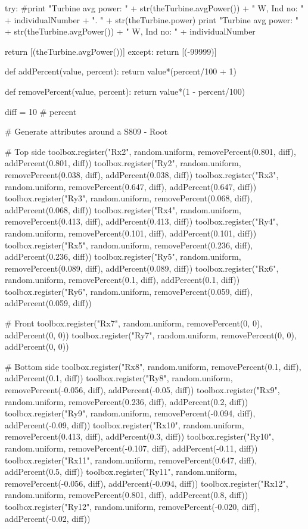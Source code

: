 \begin{pythoncode}
    
    try:
        #print "Turbine avg power: " + str(theTurbine.avgPower()) + " W, Ind no: " + individualNumber + ". " + str(theTurbine.power)
        print "Turbine avg power: " + str(theTurbine.avgPower()) + " W, Ind no: " + individualNumber 

        return [(theTurbine.avgPower())]
    except:
        return [(-99999)]


def addPercent(value, percent):
    return value*(percent/100 + 1)

def removePercent(value, percent):
    return value*(1 - percent/100)

diff = 10 # percent

# Generate attributes around a S809 - Root

# Top side
toolbox.register("Rx2", random.uniform, removePercent(0.801, diff), addPercent(0.801, diff))
toolbox.register("Ry2", random.uniform, removePercent(0.038, diff), addPercent(0.038, diff))
toolbox.register("Rx3", random.uniform, removePercent(0.647, diff), addPercent(0.647, diff))
toolbox.register("Ry3", random.uniform, removePercent(0.068, diff), addPercent(0.068, diff))
toolbox.register("Rx4", random.uniform, removePercent(0.413, diff), addPercent(0.413, diff))
toolbox.register("Ry4", random.uniform, removePercent(0.101, diff), addPercent(0.101, diff))
toolbox.register("Rx5", random.uniform, removePercent(0.236, diff), addPercent(0.236, diff))
toolbox.register("Ry5", random.uniform, removePercent(0.089, diff), addPercent(0.089, diff))
toolbox.register("Rx6", random.uniform, removePercent(0.1, diff), addPercent(0.1, diff))
toolbox.register("Ry6", random.uniform, removePercent(0.059, diff), addPercent(0.059, diff))

# Front
toolbox.register("Rx7", random.uniform, removePercent(0, 0), addPercent(0, 0))
toolbox.register("Ry7", random.uniform, removePercent(0, 0), addPercent(0, 0))

# Bottom side
toolbox.register("Rx8", random.uniform, removePercent(0.1, diff), addPercent(0.1, diff))
toolbox.register("Ry8", random.uniform, removePercent(-0.056, diff), addPercent(-0.05, diff))
toolbox.register("Rx9", random.uniform, removePercent(0.236, diff), addPercent(0.2, diff))
toolbox.register("Ry9", random.uniform, removePercent(-0.094, diff), addPercent(-0.09, diff))
toolbox.register("Rx10", random.uniform, removePercent(0.413, diff), addPercent(0.3, diff))
toolbox.register("Ry10", random.uniform, removePercent(-0.107, diff), addPercent(-0.11, diff))
toolbox.register("Rx11", random.uniform, removePercent(0.647, diff), addPercent(0.5, diff)) 
toolbox.register("Ry11", random.uniform, removePercent(-0.056, diff), addPercent(-0.094, diff))
toolbox.register("Rx12", random.uniform, removePercent(0.801, diff), addPercent(0.8, diff))
toolbox.register("Ry12", random.uniform, removePercent(-0.020, diff), addPercent(-0.02, diff))


\end{pythoncode}
